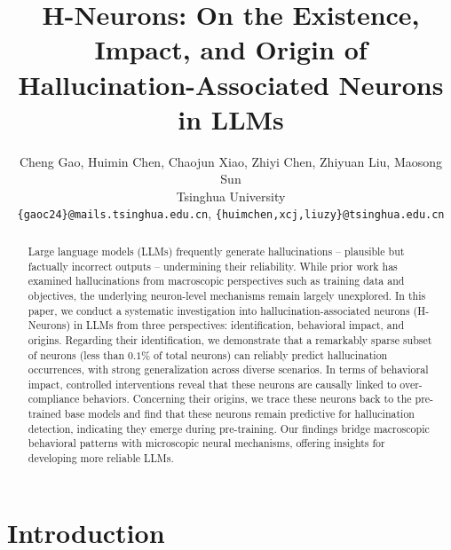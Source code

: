 \documentclass[dvipsnames]{article}
\title{H-Neurons: On the Existence, Impact, and Origin of Hallucination-Associated Neurons in LLMs}
\author{
Cheng Gao,
Huimin Chen, Chaojun Xiao,  Zhiyi Chen, 
Zhiyuan Liu, Maosong Sun\\ 
    Tsinghua University\\
 \texttt{\{gaoc24\}@mails.tsinghua.edu.cn}, \texttt{\{huimchen,xcj,liuzy\}@tsinghua.edu.cn}
}
\begin{document}
\maketitle
\vspace{3em}

\begin{abstract}
Large language models (LLMs) frequently generate hallucinations -- plausible but factually incorrect outputs -- undermining their reliability. While prior work has examined hallucinations from macroscopic perspectives such as training data and objectives, the underlying neuron-level mechanisms remain largely unexplored. In this paper, we conduct a systematic investigation into hallucination-associated neurons (H-Neurons) in LLMs from three perspectives: identification, behavioral impact, and origins. Regarding their identification, we demonstrate that a remarkably sparse subset of neurons (less than $0.1\%$ of total neurons) can reliably predict hallucination occurrences, with strong generalization across diverse scenarios. In terms of behavioral impact, controlled interventions reveal that these neurons are causally linked to over-compliance behaviors. Concerning their origins, we trace these neurons back to the pre-trained base models and find that these neurons remain predictive for hallucination detection, indicating they emerge during pre-training. Our findings bridge macroscopic behavioral patterns with microscopic neural mechanisms, offering insights for developing more reliable LLMs.
\end{abstract}


\section{Introduction}\label{sec1}

\end{document}
